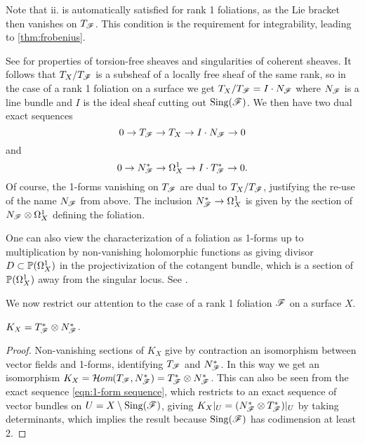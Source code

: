 \begin{remark}
    Note that ii. is automatically satisfied for rank 1 foliations, as the Lie
    bracket then vanishes on $T_\scrF$. This condition is the requirement for
    integrability, leading to \cref{thm:frobenius}.
\end{remark}

See \cite[\S2]{friedman_book} for properties of torsion-free sheaves and
singularities of coherent sheaves. It follows that $T_X/T_\scrF$ is a subsheaf
of a locally free sheaf of the same rank, so in the case of a rank 1 foliation
on a surface we get $T_X/T_\scrF=I\cdot N_\scrF$ where $N_\scrF$ is a line
bundle and $I$ is the ideal sheaf cutting out $\Sing(\scrF)$. We then have two
dual exact sequences
\begin{equation}\label{eqn:tangent sequence}
    0 \to T_\scrF \to T_X \to I\cdot N_\scrF \to 0
\end{equation}
and
\begin{equation}\label{eqn:1-form sequence}
    0 \to N_\scrF^* \to \Omega^1_X \to I\cdot T_\scrF^* \to 0.
\end{equation}
Of course, the 1-forms vanishing on $T_\scrF$ are dual to $T_X/T_\scrF$,
justifying the re-use of the name $N_\scrF$ from above. The inclusion
$N_\scrF^*\to\Omega^1_X$ is given by the section of $N_\scrF\otimes\Omega^1_X$
defining the foliation.

\begin{remark}
    One can also view the characterization of a foliation as 1-forms up to
    multiplication by non-vanishing holomorphic functions as giving divisor
    $D\subset\P(\Omega^1_X)$ in the projectivization of the cotangent bundle,
    which is a section of $\P(\Omega^1_X)$ away from the singular locus. See
    \cite[\nopp II.0]{mcquillan_98}.
\end{remark}

We now restrict our attention to the case of a rank 1 foliation $\scrF$ on a
surface $X$.

\begin{proposition}\label{prop:canonical}
    $K_X=T_\scrF^*\otimes N_\scrF^*$.
\end{proposition}

\begin{proof}
    Non-vanishing sections of $K_X$ give by contraction an isomorphism between
    vector fields and 1-forms, identifying $T_\scrF$ and $N_\scrF^*$. In this
    way we get an isomorphism
    $K_X=\shHom(T_\scrF,N_\scrF^*)=T_\scrF^*\otimes N_\scrF^*$. This can also be
    seen from the exact sequence \cref{eqn:1-form sequence}, which restricts to
    an exact sequence of vector bundles on $U=X\setminus\Sing(\scrF)$, giving
    $K_X|_U=(N_\scrF^*\otimes T_\scrF^*)|_U$ by taking determinants, which
    implies the result because $\Sing(\scrF)$ has codimension at least 2.
\end{proof}

